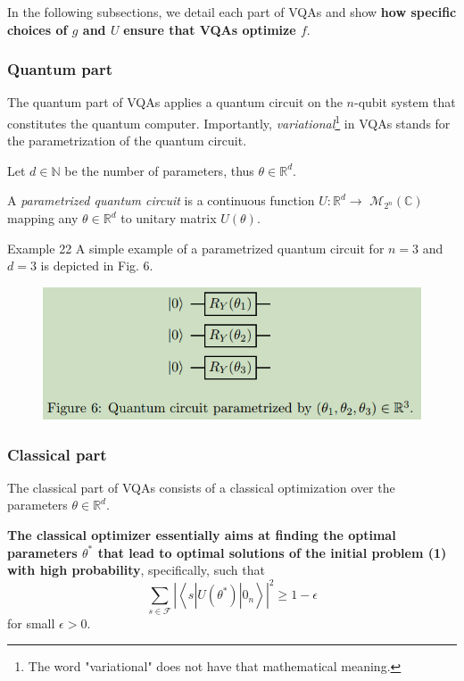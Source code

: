 In the following subsections, we detail each part of VQAs and show \textbf{how specific choices of $g$ and $U$} \textbf{ensure that VQAs optimize $f$}.

\subsubsection{Quantum part}

The quantum part of VQAs applies a quantum circuit on the $n$-qubit system that constitutes the quantum computer. Importantly, \textit{variational}\footnote{The word "variational" does not have that mathematical meaning.}  in VQAs stands for the parametrization of the quantum circuit. 

Let $d \in \mathbb{N}$ be the number of parameters, thus $\theta \in \mathbb{R}^d.$

A \textit{parametrized quantum circuit} is a continuous function $U: \mathbb{R}^{d} \rightarrow$ $\mathcal{M}_{2^{n}}(\mathbb{C})$ mapping any $\theta \in \mathbb{R}^{d}$ to unitary matrix $U(\theta)$.


Example 22 A simple example of a parametrized quantum circuit for $n=3$ and $d=3$ is depicted in Fig. 6.
\begin{figure}
    \centering
    \includegraphics[width=0.75\linewidth]{Images/parametrized-quantum-circuit.png}
\end{figure}


\subsubsection{Classical part}

The classical part of VQAs consists of a classical optimization over the parameters $\theta \in \mathbb{R}^{d}$. 

\textbf{The classical optimizer essentially aims at finding the optimal parameters $\theta^{*}$ that lead to optimal solutions of the initial problem (1) with high probability}, specifically, such that
\begin{equation*}
\sum_{s \in \mathcal{F}}\left|\left\langle s\left|U\left(\theta^{*}\right)\right| 0_{n}\right\rangle\right|^{2} \geq 1-\epsilon \tag{10}
\end{equation*}
for small $\epsilon>0$. 

